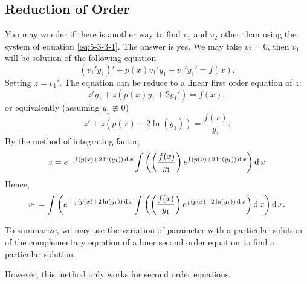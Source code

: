 \subsection{Reduction of Order}
You may wonder if there is another way to find $v_1$ and $v_2$ other than using the system of equation \eqref{eq:5-3-3-1}. The answer is yes.
We may take $v_2=0$, then $v_1$ will be solution of the following equation
\[(v_1'y_1)'+p(x)v_1'y_1+v_1'y_1'=f(x).\]
Setting $z=v_1'$. The equation can be reduce to a linear first order equation of $z$:
\[z'y_1 + z(p(x)y_1+2y_1')=f(x),\]
or equivalently (assuming $y_1\not\equiv 0$)
\[z'+z(p(x)+2\ln(y_1))=\frac{f(x)}{y_1}.\]
By the method of integrating factor, 
\[z=e^{-\int(p(x)+2\ln(y_1))\operatorname{d} x}\int\left(\left(\frac{f(x)}{y_1}\right)e^{\int(p(x)+2\ln(y_1))\operatorname{d} x}\right)\operatorname{d} x\]
Hence,
\[v_1=\int\left(e^{-\int(p(x)+2\ln(y_1))\operatorname{d} x}\int\left(\left(\frac{f(x)}{y_1}\right)e^{\int(p(x)+2\ln(y_1))\operatorname{d} x}\right)\operatorname{d} x\right)\operatorname{d} x.\]


To summarize, we may use the variation of parameter with a particular solution of the complementary equation of a liner second order equation to find a particular solution. 

However, this method only works for second order equations.

